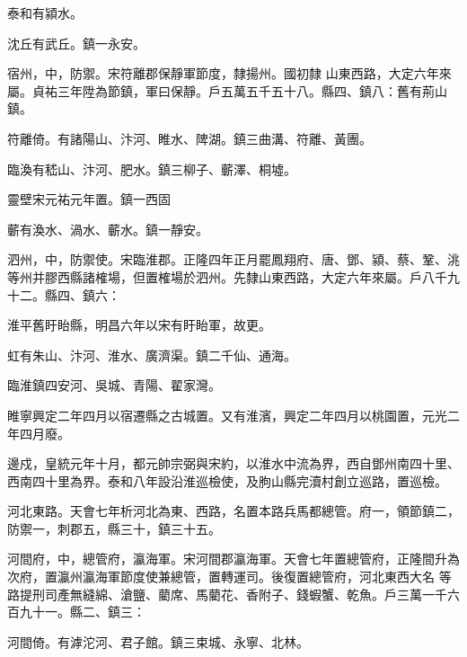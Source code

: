 \begin{pinyinscope}
 泰和有潁水。



 沈丘有武丘。鎮一永安。



 宿州，中，防禦。宋符離郡保靜軍節度，隸揚州。國初隸
 山東西路，大定六年來屬。貞祐三年陞為節鎮，軍曰保靜。戶五萬五千五十八。縣四、鎮八：舊有荊山鎮。



 符離倚。有諸陽山、汴河、睢水、陴湖。鎮三曲溝、符離、黃團。



 臨渙有嵇山、汴河、肥水。鎮三柳子、蘄澤、桐墟。



 靈壁宋元祐元年置。鎮一西固



 蘄有渙水、渦水、蘄水。鎮一靜安。



 泗州，中，防禦使。宋臨淮郡。正隆四年正月罷鳳翔府、唐、鄧、潁、蔡、鞏、洮等州并膠西縣諸榷場，但置榷場於泗州。先隸山東西路，大定六年來屬。戶八千九十二。縣四、鎮六：



 淮平舊盱眙縣，明昌六年以宋有盱眙軍，故更。



 虹有朱山、汴河、淮水、廣濟渠。鎮二千仙、通海。



 臨淮鎮四安河、吳城、青陽、翟家灣。



 睢寧興定二年四月以宿遷縣之古城置。又有淮濱，興定二年四月以桃園置，元光二年四月廢。



 邊戍，皇統元年十月，都元帥宗弼與宋約，以淮水中流為界，西自鄧州南四十里、西南四十里為界。泰和八年設沿淮巡檢使，及朐山縣完瀆村創立巡路，置巡檢。



 河北東路。天會七年析河北為東、西路，名置本路兵馬都總管。府一，領節鎮二，防禦一，刺郡五，縣三十，鎮三十五。



 河間府，中，總管府，瀛海軍。宋河間郡瀛海軍。天會七年置總管府，正隆間升為次府，置瀛州瀛海軍節度使兼總管，置轉運司。後復置總管府，河北東西大名
 等路提刑司產無縫綿、滄鹽、藺席、馬藺花、香附子、錢蝦蟹、乾魚。戶三萬一千六百九十一。縣二、鎮三：



 河間倚。有滹沱河、君子館。鎮三束城、永寧、北林。




\end{pinyinscope}
